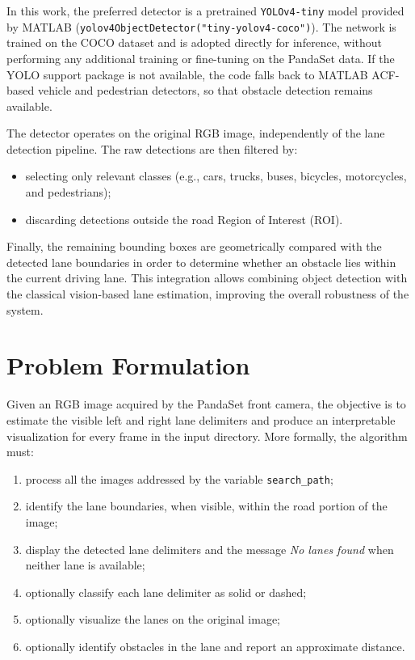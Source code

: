 \documentclass[conference]{IEEEtran}
\begin{document}
In this work, the preferred detector is a pretrained \texttt{YOLOv4-tiny} model provided by MATLAB (\texttt{yolov4ObjectDetector("tiny-yolov4-coco")}). The network is trained on the COCO dataset and is adopted directly for inference, without performing any additional training or fine-tuning on the PandaSet data. If the YOLO support package is not available, the code falls back to MATLAB ACF-based vehicle and pedestrian detectors, so that obstacle detection remains available.

The detector operates on the original RGB image, independently of the lane detection pipeline. The raw detections are then filtered by:
\begin{itemize}
    \item selecting only relevant classes (e.g., cars, trucks, buses, bicycles, motorcycles, and pedestrians);
    \item discarding detections outside the road Region of Interest (ROI).
\end{itemize}

Finally, the remaining bounding boxes are geometrically compared with the detected lane boundaries in order to determine whether an obstacle lies within the current driving lane. This integration allows combining object detection with the classical vision-based lane estimation, improving the overall robustness of the system.

\section{Problem Formulation}
Given an RGB image acquired by the PandaSet front camera, the objective is to estimate the visible left and right lane delimiters and produce an interpretable visualization for every frame in the input directory. More formally, the algorithm must:
\begin{enumerate}
    \item process all the images addressed by the variable \texttt{search\_path};
    \item identify the lane boundaries, when visible, within the road portion of the image;
    \item display the detected lane delimiters and the message \textit{No lanes found} when neither lane is available;
    \item optionally classify each lane delimiter as solid or dashed;
    \item optionally visualize the lanes on the original image;
    \item optionally identify obstacles in the lane and report an approximate distance.
\end{enumerate}
\end{document}
